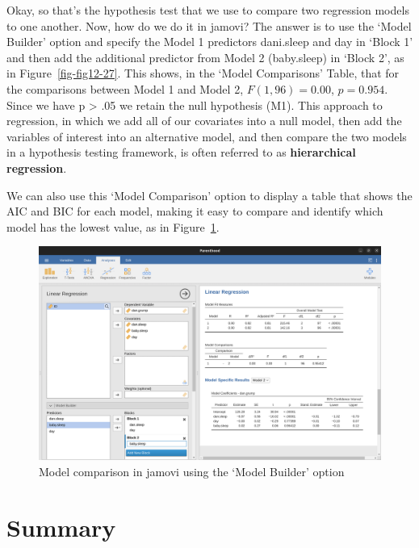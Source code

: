 \documentclass[
  a4paper,
]{book}
\begin{document}
Okay, so that's the hypothesis test that we use to compare two
regression models to one another. Now, how do we do it in jamovi? The
answer is to use the `Model Builder' option and specify the Model 1
predictors dani.sleep and day in `Block 1' and then add the additional
predictor from Model 2 (baby.sleep) in `Block 2', as in
Figure~\ref{fig-fig12-27}. This shows, in the `Model Comparisons' Table,
that for the comparisons between Model 1 and Model 2,
\(F(1,96) = 0.00\), \(p = 0.954\). Since we have p \textgreater{} .05 we
retain the null hypothesis (M1). This approach to regression, in which
we add all of our covariates into a null model, then add the variables
of interest into an alternative model, and then compare the two models
in a hypothesis testing framework, is often referred to as
\textbf{hierarchical regression}.

We can also use this `Model Comparison' option to display a table that
shows the AIC and BIC for each model, making it easy to compare and
identify which model has the lowest value, as in
Figure~\ref{fig-fig12-28}.

\begin{figure}

\includegraphics[width=1\textwidth,height=\textheight]{images/fig12-28.png} \hfill{}

\caption{\label{fig-fig12-28}Model comparison in jamovi using the `Model
Builder' option}

\end{figure}

\hypertarget{summary}{%
\section{Summary}\label{summary}}
\end{document}
